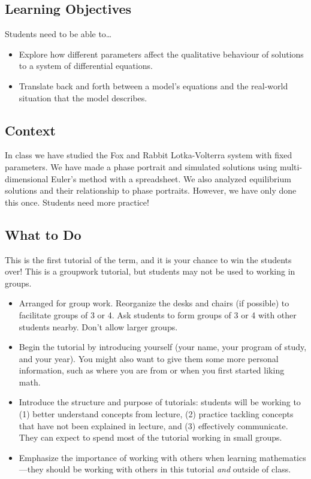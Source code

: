 		\subsection*{Learning Objectives} Students need to be able to\ldots
		\begin{itemize}
			\item Explore how different parameters affect the qualitative
				behaviour of solutions to a system of differential equations.
			\item Translate back and forth between a model's equations and
				the real-world situation that the model describes.
		\end{itemize}


		\subsection*{Context} In class we have studied the Fox and Rabbit
		Lotka-Volterra system with fixed parameters. We have made a phase portrait
		and simulated solutions using multi-dimensional Euler's method with
		a spreadsheet. We also analyzed equilibrium solutions and their
		relationship to phase portraits. However, we have only done this once.
		Students need more practice!


		\subsection*{What to Do} This is the first tutorial of the term, and
		it is your chance to win the students over! This is a groupwork tutorial,
		but students may not be used to working in groups.

		\begin{itemize}
			\item Arranged for group work. Reorganize the desks and chairs
				(if possible) to facilitate groups of 3 or 4. Ask
				students to form groups of 3 or 4 with other students
				nearby. Don't allow larger groups.

			\item Begin the tutorial by introducing yourself (your name,
				your program of study, and your year). You might
				also want to give them some more personal information,
				such as where you are from or when you first started liking math.

			\item Introduce the structure and purpose of tutorials: students
				will be working to (1) better understand concepts
				from lecture, (2) practice tackling concepts that
				have not been explained in lecture, and (3) effectively
				communicate. They can expect to spend most of the
				tutorial working in small groups.

			\item Emphasize the importance of working with others when
				learning mathematics---they should be working with
				others in this tutorial \emph{and} outside of
				class.
		\end{itemize}

